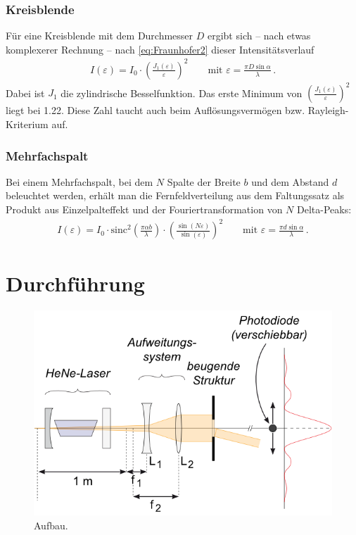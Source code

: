 \documentclass[12pt,a4paper,titlepage,headinclude,bibtotoc]{scrartcl}
\newcommand{\sinc}{\ensuremath{\mathrm{sinc}}}
\begin{document}
\subsubsection{Kreisblende}
Für eine Kreisblende mit dem Durchmesser $D$ ergibt sich -- nach etwas komplexerer Rechnung -- nach \eqref{eq:Fraunhofer2} dieser Intensitätsverlauf
\begin{align}
	I(\varepsilon)=I_0 \cdot \left(\frac{J_1(\varepsilon)}{\varepsilon}\right)^2 \qquad \text{mit }\varepsilon= \frac{\pi D \sin \alpha}{\lambda}\,.
\end{align}
Dabei ist $J_1$ die zylindrische Besselfunktion.
Das erste Minimum von $\left(\frac{J_1(\varepsilon)}{\varepsilon}\right)^2$ liegt bei 1.22.
Diese Zahl taucht auch beim Auflösungsvermögen bzw. Rayleigh-Kriterium auf.

\subsubsection{Mehrfachspalt}
Bei einem Mehrfachspalt, bei dem $N$ Spalte der Breite $b$ und dem Abstand $d$ beleuchtet werden, erhält man die Fernfeldverteilung aus dem Faltungssatz als Produkt aus Einzelpalteffekt und der Fouriertransformation von $N$ Delta-Peaks:
\begin{align}
	I(\varepsilon)=I_0 \cdot \sinc^2\left(\frac{\pi\alpha b}{\lambda}\right) \cdot \left(\frac{\sin(N\varepsilon)}{\sin(\varepsilon)}\right)^2 \qquad \text{mit }\varepsilon= \frac{\pi d \sin \alpha}{\lambda}\,.
\end{align}

\section{Durchführung}
\label{sec:durchfuehrung}
\begin{figure}[!h]
	\centering
	\includegraphics[scale=0.7]{Aufbau.png}
	\caption{Aufbau. \cite[Datum: 02.01.15]{LP21}}
\end{figure}
\end{document}
